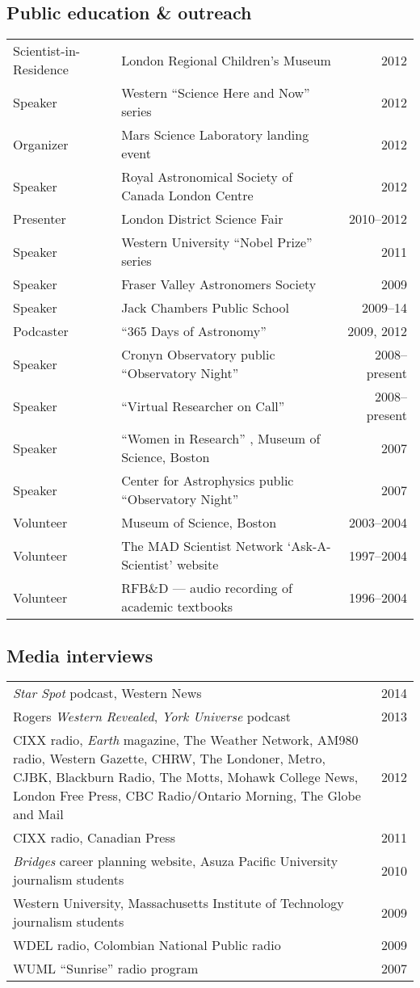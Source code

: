 \documentclass[12pt]{article}
\begin{document}
\subsection{Public education \& outreach}
\begin{tabularx}{\textwidth}{lXr}
Scientist-in-Residence& London Regional Children's Museum& 2012\\
Speaker& Western ``Science Here and Now'' series& 2012\\
Organizer& Mars Science Laboratory landing event& 2012\\
Speaker& Royal Astronomical Society of Canada London Centre& 2012\\
Presenter& London District Science Fair& 2010--2012\\
Speaker& Western University ``Nobel Prize'' series& 2011\\
Speaker& Fraser Valley Astronomers Society& 2009\\
Speaker& Jack Chambers Public School& 2009--14\\
Podcaster &  ``365 Days of Astronomy''  &2009, 2012\\
Speaker& Cronyn Observatory public ``Observatory Night'' & 2008--present\\
Speaker& ``Virtual Researcher on Call'' & 2008--present\\
Speaker & ``Women in Research'' , Museum of Science, Boston& 2007\\
Speaker& Center for Astrophysics public ``Observatory Night'' & 2007\\
Volunteer& Museum of Science, Boston& 2003--2004\\
Volunteer& The MAD Scientist Network `Ask-A-Scientist' website& 1997--2004\\
Volunteer& RFB\&D --- audio recording of academic textbooks& 1996--2004\\
\end{tabularx}

\subsection{Media interviews}
\begin{tabularx}{\textwidth}{Xr}
{\em Star Spot} podcast, Western News & 2014\\
Rogers {\em Western Revealed}, {\em York Universe} podcast & 2013\\
CIXX radio, {\em Earth} magazine, The Weather Network, AM980 radio, Western Gazette, CHRW, The Londoner, Metro, CJBK, Blackburn Radio, The Motts, Mohawk College News, London Free Press, CBC Radio/Ontario Morning, The Globe and Mail& 2012\\
CIXX radio, Canadian Press&  2011\\
{\em Bridges} career planning website, Asuza Pacific University journalism students& 2010\\
Western University, Massachusetts Institute of Technology journalism students& 2009\\
WDEL radio, Colombian National Public radio & 2009\\ 
WUML ``Sunrise'' radio program & 2007\\ 
\end{tabularx}
\end{document}
